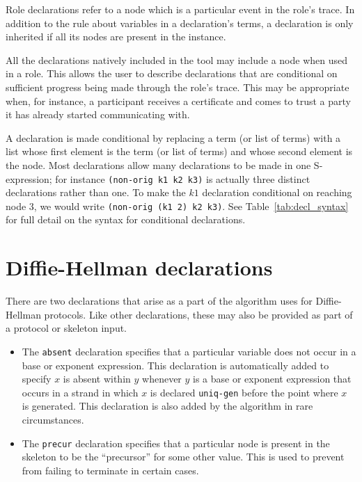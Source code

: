 Role declarations refer to a node which is a particular event in the
role's trace.  In addition to the rule about variables in a
declaration's terms, a declaration is only inherited if all its nodes
are present in the instance.

 All the declarations natively
included in the tool may include a node when used in a role.  This
allows the user to describe declarations that are conditional on
sufficient progress being made through the role's trace.  This may
be appropriate when, for instance, a participant receives a certificate
and comes to trust a party it has already started communicating with.

A declaration is made conditional by replacing a term (or list of
terms) with a list whose first element is the term (or list of terms)
and whose second element is the node.  Most {\cpsa} declarations allow
many declarations to be made in one S-expression; for instance
\texttt{(non-orig k1 k2 k3)} is actually three distinct declarations
rather than one.  To make the $k1$ declaration conditional on reaching
node 3, we would write \texttt{(non-orig (k1 2) k2 k3)}.  See
Table~\ref{tab:decl_syntax} for full detail on the syntax for
conditional declarations.

\section{Diffie-Hellman declarations}
There are two declarations that arise as a part of the algorithm
{\cpsa} uses for Diffie-Hellman protocols.  Like other declarations,
these may also be provided as part of a protocol or skeleton input.

\begin{itemize}

  \item {} The \texttt{absent} declaration specifies
    that a particular  variable does not occur in a base or
    exponent expression.  This declaration is automatically added to
    specify $x$ is absent within $y$ whenever $y$ is a base or
    exponent expression that occurs in a strand in which $x$ is
    declared \texttt{uniq-gen} before the point where $x$ is
    generated.  This declaration is also added by the algorithm in
    rare circumstances.

  \item {} The \texttt{precur} declaration specifies
    that a particular node is present in the skeleton to be the
    ``precursor'' for some other value.  This is used to prevent
    {\cpsa} from failing to terminate in certain cases.
\end{itemize}

